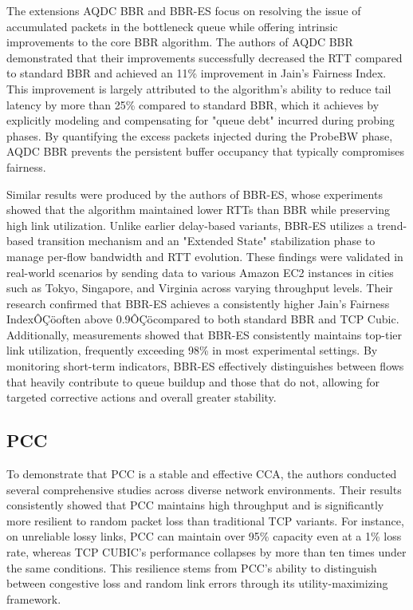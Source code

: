 \documentclass[conference]{IEEEtran}
\begin{document}
The extensions AQDC BBR and BBR-ES focus on resolving the issue of accumulated packets in the bottleneck queue while offering intrinsic improvements to the core BBR algorithm.
The authors of AQDC BBR demonstrated that their improvements successfully decreased the RTT compared to standard BBR and achieved an 11\% improvement in Jain's Fairness Index. 
This improvement is largely attributed to the algorithm's ability to reduce tail latency by more than 25\% compared to standard BBR, which it achieves by explicitly modeling and compensating for "queue debt" incurred during probing phases. 
By quantifying the excess packets injected during the ProbeBW phase, AQDC BBR prevents the persistent buffer occupancy that typically compromises fairness.

Similar results were produced by the authors of BBR-ES, whose experiments showed that the algorithm maintained lower RTTs than BBR while preserving high link utilization. 
Unlike earlier delay-based variants, BBR-ES utilizes a trend-based transition mechanism and an "Extended State" stabilization phase to manage per-flow bandwidth and RTT evolution. 
These findings were validated in real-world scenarios by sending data to various Amazon EC2 instances in cities such as Tokyo, Singapore, and Virginia across varying throughput levels. 
Their research confirmed that BBR-ES achieves a consistently higher Jain's Fairness IndexÔÇöoften above 0.9ÔÇöcompared to both standard BBR and TCP Cubic. 
Additionally, measurements showed that BBR-ES consistently maintains top-tier link utilization, frequently exceeding 98\% in most experimental settings. 
By monitoring short-term indicators, BBR-ES effectively distinguishes between flows that heavily contribute to queue buildup and those that do not, allowing for targeted corrective actions and overall greater stability.

\subsection{PCC}

To demonstrate that PCC is a stable and effective \acs{CCA}, the authors conducted several comprehensive studies across diverse network environments. 
Their results consistently showed that PCC maintains high throughput and is significantly more resilient to random packet loss than traditional TCP variants. 
For instance, on unreliable lossy links, PCC can maintain over 95\% capacity even at a 1\% loss rate\cite{PCC}, whereas TCP CUBIC's performance collapses by more than ten times under the same conditions.\cite{PCCEVALUATION} 
This resilience stems from PCC's ability to distinguish between congestive loss and random link errors through its utility-maximizing framework.  
\end{document}
